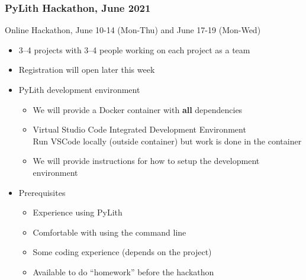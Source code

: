 \documentclass[aspectratio=169]{beamer}
\begin{document}
\begin{frame}
  \frametitle{PyLith Hackathon, June 2021}
  \summary{}

  Online Hackathon, June 10-14 (Mon-Thu) and June 17-19 (Mon-Wed)

  \vfill

  \begin{itemize}
  \item 3--4 projects with 3--4 people working on each project as a team
  \item Registration will open later this week
  \item PyLith development environment
    \begin{itemize}
    \item We will provide a Docker container with {\bf all} dependencies
    \item Virtual Studio Code Integrated Development Environment\\
      Run VSCode locally (outside container) but work is done in the container
    \item We will provide instructions for how to setup the development environment
    \end{itemize}
  \item Prerequisites
    \begin{itemize}
    \item Experience using PyLith
    \item Comfortable with using the command line
    \item Some coding experience (depends on the project)
    \item Available to do ``homework'' before the hackathon
    \end{itemize}
  \end{itemize}
  
\end{frame}
\end{document}
